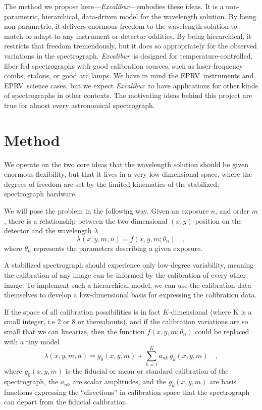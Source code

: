 \documentclass[12pt, letterpaper]{article}
\newcommand{\project}[1]{\textsl{#1}}
\newcommand{\name}{\project{Excalibur}}
\newcommand{\acronym}[1]{{\small{#1}}}
\newcommand{\eprv}{\acronym{EPRV}}
\begin{document}
The method we propose here---\name---embodies these ideas.
It is a non-parametric, hierarchical, data-driven model for the
wavelength solution.
By being non-parametric, it delivers enormous freedom to the
wavelength solution to match or adapt to any instrument or detector
oddities.
By being hierarchical, it restricts that freedom tremendously, but it
does so appropriately for the observed variations in the
spectrograph.
\name\ is designed for temperature-controlled, fiber-fed
spectrographs with good calibration sources, such as laser-frequency
combs, etalons, or good arc lamps.
We have in mind the \eprv\ instruments and \eprv\ science cases, but we expect \name\ to have applications for other kinds of
spectrographs in other contexts.  The motivating ideas behind this
project are true for almost every astronomical spectrograph.

\section{Method} \label{sec:method}
We operate on the two core ideas that the wavelength solution should be given enormous flexibility, but that it lives in a very low-dimensional space, where the degrees of freedom are set by the limited kinematics of the stabilized, spectrograph hardware.

We will pose the problem in the following way.  Given an exposure $n$, and order $m$, there is a relationship between
the two-dimensional $(x,y)$-position on the detector and the
wavelength $\lambda$
\begin{equation}
\lambda(x,y,m,n) = f(x,y,m;\theta_{n})
\quad ,
\end{equation}
where $\theta_{n}$ represents the parameters describing a given exposure.

A stabilized spectrograph should experience only low-degree variability, meaning the calibration of any image can be informed by the calibration of every other image.  To implement such a hierarchical model, we can use the calibration data themselves to develop a low-dimensional basis for expressing the calibration data.

If the space of all calibration possibilities is in fact $K$-dimensional (where K is a small integer, i.e 2 or 8 or thereabouts), and if the calibration variations are so small that we can linearize, then the function $f(x,y,m;\theta_{n})$ could be replaced with a tiny model
\begin{equation}
\lambda(x,y,m,n) = g_0(x,y,m) + \sum_{k=1}^K a_{nk}\,g_k(x,y,m)
\quad ,
\end{equation}
where
$g_0(x,y,m)$ is the fiducial or mean or standard calibration of the spectrograph,
the $a_{nk}$ are scalar amplitudes,
and the $g_k(x,y,m)$ are basis functions expressing the ``directions'' in calibration space that the spectrograph can depart from the fiducial calibration.
\end{document}
